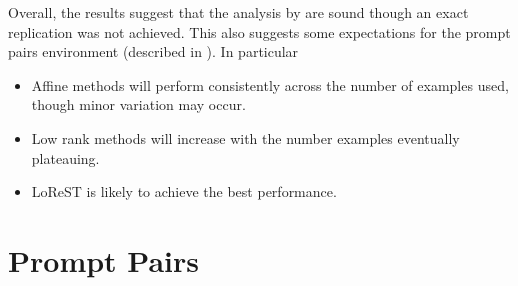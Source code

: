 Overall, the results suggest that the analysis by \citet{steering-clear} are sound though an exact replication was not achieved.
This also suggests some expectations for the prompt pairs environment (described in ).
In particular
\begin{itemize}[nolistsep]
    \item Affine methods will perform consistently across the number of examples used, though minor variation may occur.
    \item Low rank methods will increase with the number examples eventually plateauing.
    \item LoReST is likely to achieve the best performance.
\end{itemize}

\section{Prompt Pairs}
\label{sec:prompt-pairs-res}

